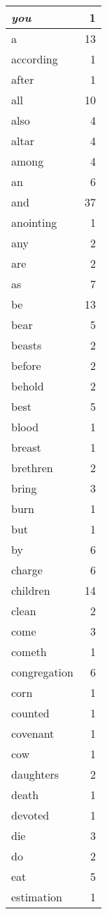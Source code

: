 \begin{center}
\begin{longtable}{l|r}
\emph{you} & 1 \\ \hline
a & 13 \\ \hline
according & 1 \\ \hline
after & 1 \\ \hline
all & 10 \\ \hline
also & 4 \\ \hline
altar & 4 \\ \hline
among & 4 \\ \hline
an & 6 \\ \hline
and & 37 \\ \hline
anointing & 1 \\ \hline
any & 2 \\ \hline
are & 2 \\ \hline
as & 7 \\ \hline
be & 13 \\ \hline
bear & 5 \\ \hline
beasts & 2 \\ \hline
before & 2 \\ \hline
behold & 2 \\ \hline
best & 5 \\ \hline
blood & 1 \\ \hline
breast & 1 \\ \hline
brethren & 2 \\ \hline
bring & 3 \\ \hline
burn & 1 \\ \hline
but & 1 \\ \hline
by & 6 \\ \hline
charge & 6 \\ \hline
children & 14 \\ \hline
clean & 2 \\ \hline
come & 3 \\ \hline
cometh & 1 \\ \hline
congregation & 6 \\ \hline
corn & 1 \\ \hline
counted & 1 \\ \hline
covenant & 1 \\ \hline
cow & 1 \\ \hline
daughters & 2 \\ \hline
death & 1 \\ \hline
devoted & 1 \\ \hline
die & 3 \\ \hline
do & 2 \\ \hline
eat & 5 \\ \hline
estimation & 1 \\ \hline

\end{longtable}
\end{center}

